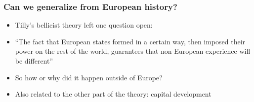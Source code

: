\documentclass[utf8, xcolor=dvipsnames, handout]{beamer}
\begin{document}
\begin{frame}
\frametitle{Can we generalize from European history?}
\centering

\begin{itemize}[<+->]
  \item Tilly's bellicist theory left one question open:
  \item[] ``The fact that European states formed in a certain way, then imposed their power on the rest of the world, guarantees that non-European experience will be different''
  \item So how or why did it happen outside of Europe?
  \item Also related to the other part of the theory: capital development
\end{itemize}

\end{frame}
\end{document}
